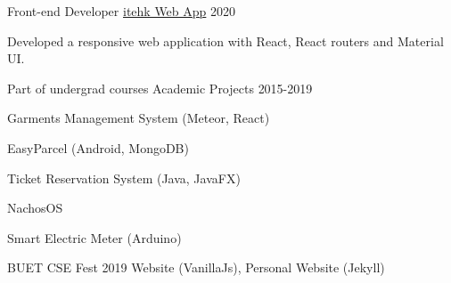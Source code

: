 

\begin{cventries}

  \cventry
    {Front-end Developer} %
    {\href{https://itehk.co}{itehk Web App}} %
    {} %
    {2020} %
    {
      \begin{cvitems} %
        \item {Developed a responsive web application with React, React routers and Material UI.}
      \end{cvitems}
    }

  \cventry
    {Part of undergrad courses} %
    {Academic Projects} %
    {} %
    {2015-2019} %
    {
      \begin{cvitems} %
        \item {Garments Management System (Meteor, React)}
        \item {EasyParcel (Android, MongoDB)}
        \item { Ticket Reservation System (Java, JavaFX)}
        \item {NachosOS}
        \item {Smart Electric Meter (Arduino)}
        \item {BUET CSE Fest 2019 Website (VanillaJs), Personal Website (Jekyll)}
      \end{cvitems}
    }


\end{cventries}
